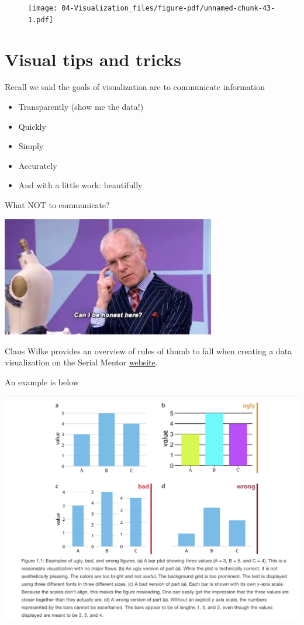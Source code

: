 \documentclass[
  letterpaper,
  DIV=11,
  numbers=noendperiod]{scrreprt}
\providecommand{\tightlist}{%
  \setlength{\itemsep}{0pt}\setlength{\parskip}{0pt}}\usepackage{longtable,booktabs,array}
\begin{document}
\begin{figure}[H]

{\centering \texttt{[image: 04-Visualization\_files/figure-pdf/unnamed-chunk-43-1.pdf]}

}

\end{figure}

\hypertarget{visual-tips-and-tricks}{%
\section{Visual tips and tricks}\label{visual-tips-and-tricks}}

Recall we said the goals of visualization are to communicate information

\begin{itemize}
\tightlist
\item
  Transparently (show me the data!)
\item
  Quickly
\item
  Simply
\item
  Accurately
\item
  And with a little work: beautifully
\end{itemize}

What NOT to communicate?

\includegraphics[width=0.7\textwidth,height=\textheight]{images/honestrunway.jpeg}

Claus Wilke provides an overview of rules of thumb to fall when creating
a data visualization on the Serial Mentor
\href{https://serialmentor.com/dataviz/}{website}.

An example is below

\includegraphics{images/ugbadwrong.png}
\end{document}
